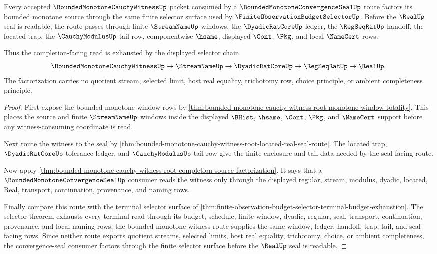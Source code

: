 \begin{theorem}
\label{thm:bounded-monotone-cauchy-witness-window-selector-factorization}
Every accepted $\BoundedMonotoneCauchyWitnessUp$ packet consumed by a $\BoundedMonotoneConvergenceSealUp$ route factors its bounded monotone source through the same finite selector surface used by $\FiniteObservationBudgetSelectorUp$. Before the $\RealUp$ seal is readable, the route passes through finite $\StreamNameUp$ windows, the $\DyadicRatCoreUp$ ledger, the $\RegSeqRatUp$ handoff, the located trap, the $\CauchyModulusUp$ tail row, componentwise $\hsame$, displayed $\Cont$, $\Pkg$, and local $\NameCert$ rows.

Thus the completion-facing read is exhausted by the displayed selector chain
$$
\BoundedMonotoneCauchyWitnessUp \to \StreamNameUp \to \DyadicRatCoreUp \to \RegSeqRatUp \to \RealUp.
$$
The factorization carries no quotient stream, selected limit, host real equality, trichotomy row, choice principle, or ambient completeness principle.
\end{theorem}
\begin{proof}
First expose the bounded monotone window rows by \autoref{thm:bounded-monotone-cauchy-witness-root-monotone-window-totality}. This places the source and finite $\StreamNameUp$ windows inside the displayed $\BHist$, $\hsame$, $\Cont$, $\Pkg$, and $\NameCert$ support before any witness-consuming coordinate is read.

Next route the witness to the seal by \autoref{thm:bounded-monotone-cauchy-witness-root-located-real-seal-route}. The located trap, $\DyadicRatCoreUp$ tolerance ledger, and $\CauchyModulusUp$ tail row give the finite enclosure and tail data needed by the seal-facing route.

Now apply \autoref{thm:bounded-monotone-cauchy-witness-root-completion-source-factorization}. It says that a $\BoundedMonotoneConvergenceSealUp$ consumer reads the witness only through the displayed regular, stream, modulus, dyadic, located, Real, transport, continuation, provenance, and naming rows.

Finally compare this route with the terminal selector surface of \autoref{thm:finite-observation-budget-selector-terminal-budget-exhaustion}. The selector theorem exhausts every terminal read through its budget, schedule, finite window, dyadic, regular, seal, transport, continuation, provenance, and local naming rows; the bounded monotone witness route supplies the same window, ledger, handoff, trap, tail, and seal-facing rows. Since neither route exports quotient streams, selected limits, host real equality, trichotomy, choice, or ambient completeness, the convergence-seal consumer factors through the finite selector surface before the $\RealUp$ seal is readable.
\end{proof}

